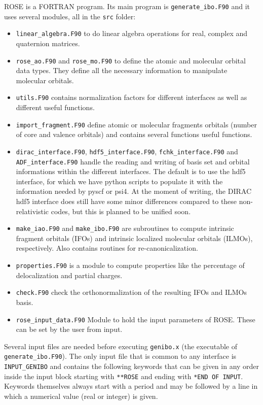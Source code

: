 \documentclass[preprint]{revtex4-1}
\begin{document}
ROSE is a FORTRAN program. Its main program is \verb|generate_ibo.F90| and
it uses several modules, all in the \verb|src| folder:
\begin{itemize}
\item \verb|linear_algebra.F90| to do linear algebra operations for real, complex and quaternion matrices.
\item \verb|rose_ao.F90| and \verb|rose_mo.F90| to define the atomic and molecular orbital data types. They define all the necessary information to manipulate molecular orbitals.
\item \verb|utils.F90| contains normalization factors for different interfaces as well as different useful functions.
\item \verb|import_fragment.F90| define atomic or molecular fragments orbitals (number of core and valence orbitals) and contains several functions useful functions.
\item \verb|dirac_interface.F90|, \verb|hdf5_interface.F90|,
\verb|fchk_interface.F90| and \verb|ADF_interface.F90| handle the reading and writing of basis set and orbital informations within the different interfaces. The default is to use
the hdf5 interface, for which we have python scripts to populate it with the information needed by pyscf or psi4. At the moment of writing, the DIRAC hdf5 interface does still
have some minor differences compared to these non-relativistic codes, but this is planned to be unified soon. 
\item \verb|make_iao.F90| and \verb|make_ibo.F90| are subroutines to compute intrinsic fragment orbitals (IFOs) and intrinsic localized molecular orbitals (ILMOs), respectively. Also contains routines for re-canonicalization.
\item \verb|properties.F90| is a module to compute properties like the percentage of delocalization and partial charges.
\item \verb|check.F90| check the orthonormalization of the resulting IFOs and ILMOs basis.
\item \verb|rose_input_data.F90| Module to hold the input parameters of ROSE. These can be set by the user from input.
\end{itemize}

Several input files are needed before executing \verb|genibo.x| (the 
executable of \verb|generate_ibo.F90|). The only input file that is common to any
interface is \verb|INPUT_GENIBO| and contains the following keywords that can be given in any order inside the input block starting with \verb|**ROSE| and ending
with \verb|*END OF INPUT|. Keywords themselves always start with a period and may be followed by a line in which a numerical value (real or integer) is given.
\end{document}
